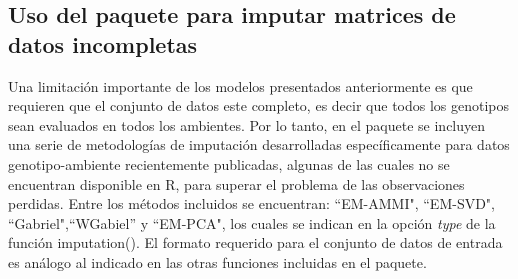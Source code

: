

\subsection{Uso del paquete para imputar matrices de datos incompletas}
\label{subsec:metimp}

Una limitación importante de los modelos presentados anteriormente es que requieren que el conjunto de datos este completo, es decir que todos los genotipos sean evaluados en todos los ambientes. Por lo tanto, en el paquete se incluyen una serie de metodologías de imputación desarrolladas específicamente para datos genotipo-ambiente recientemente publicadas, algunas de las cuales no se encuentran disponible en R, para superar el problema de las observaciones perdidas. Entre los métodos incluidos se encuentran: ``EM-AMMI", ``EM-SVD", ``Gabriel",``WGabiel''  y ``EM-PCA", los cuales se indican en la opción \emph{type} de la función \textcolor{fandango}{imputation()}. El formato requerido para el conjunto de datos de entrada es análogo al indicado en las otras funciones incluidas en el paquete. 

